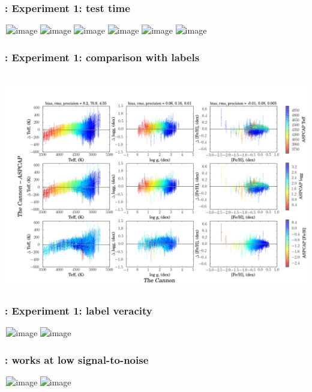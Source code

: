 \documentclass[pdftex]{beamer}
\begin{document}
\results

\begin{frame}
  \frametitle{\tc: Experiment 1: test time}
  \,\hfill\includegraphics<1>[height=\figureheight]{../documents/paper1/plots/4431_v19.png}
         \includegraphics<2>[height=\figureheight]{../documents/paper1/plots/4383_v19.png}
         \includegraphics<3>[height=\figureheight]{../documents/paper1/plots/4399_v19.png}
         \includegraphics<4>[height=\figureheight]{../documents/paper1/plots/4309_v19.png}
         \includegraphics<5>[height=\figureheight]{../documents/paper1/plots/4311_v19.png}
         \includegraphics<6>[height=\figureheight]{../documents/paper1/plots/4255_v19.png} 
\end{frame}

\begin{frame}
  \frametitle{\tc: Experiment 1: comparison with \textsl{} labels}
  \,\hfill\includegraphics[height=\figureheight]{../documents/paper1/plots/cplot2.png} 
\end{frame}

\begin{frame}
  \frametitle{\tc: Experiment 1: label veracity}
  \,\hfill\includegraphics<1>[height=\figureheight]{../documents/paper1/plots/iso2_2.png}
         \includegraphics<2>[height=\figureheight]{../documents/paper1/plots/iso2a_2.png}
\end{frame}

\begin{frame}
  \frametitle{\tc: works at low signal-to-noise}
  \,\hfill\includegraphics<1>[height=\figureheight]{../documents/paper1/plots/SNR100to200.png}
         \includegraphics<2>[height=\figureheight]{../documents/paper1/plots/SNR20to30.png}
\end{frame}
\end{document}
